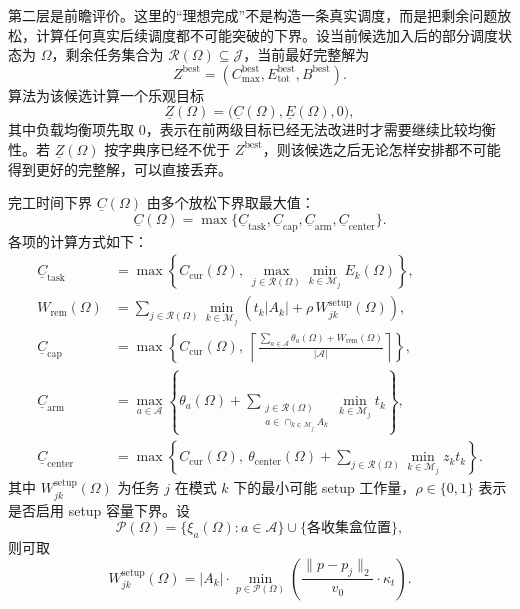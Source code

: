 第二层是前瞻评价。这里的“理想完成”不是构造一条真实调度，而是把剩余问题放松，计算任何真实后续调度都不可能突破的下界。设当前候选加入后的部分调度状态为 $\Omega$，剩余任务集合为 $\mathcal{R}(\Omega)\subseteq\mathcal{J}$，当前最好完整解为
\[
    Z^{\mathrm{best}}=(C_{\max}^{\mathrm{best}},E_{\mathrm{tot}}^{\mathrm{best}},B^{\mathrm{best}}).
\]
算法为该候选计算一个乐观目标
\[
    \underline{Z}(\Omega)=\bigl(\underline C(\Omega),\underline E(\Omega),0\bigr),
\]
其中负载均衡项先取 $0$，表示在前两级目标已经无法改进时才需要继续比较均衡性。若 $\underline{Z}(\Omega)$ 按字典序已经不优于 $Z^{\mathrm{best}}$，则该候选之后无论怎样安排都不可能得到更好的完整解，可以直接丢弃。

完工时间下界 $\underline C(\Omega)$ 由多个放松下界取最大值：
\[
    \underline C(\Omega)
    = \max\{\underline C_{\mathrm{task}},
             \underline C_{\mathrm{cap}},
             \underline C_{\mathrm{arm}},
             \underline C_{\mathrm{center}}\}.
\]
各项的计算方式如下：
\[
\begin{aligned}
    \underline C_{\mathrm{task}}
    &= \max\left\{C_{\mathrm{cur}}(\Omega),\ 
       \max_{j\in\mathcal{R}(\Omega)}\min_{k\in\mathcal{M}_j} E_k(\Omega)\right\},\\
    W_{\mathrm{rem}}(\Omega)
    &= \sum_{j\in\mathcal{R}(\Omega)}
       \min_{k\in\mathcal{M}_j}\left(t_k|A_k|+\rho\, W_{jk}^{\mathrm{setup}}(\Omega)\right),\\
    \underline C_{\mathrm{cap}}
    &= \max\left\{C_{\mathrm{cur}}(\Omega),\
       \left\lceil \frac{\sum_{a\in \mathcal{A}} \theta_a(\Omega)+W_{\mathrm{rem}}(\Omega)}{|\mathcal{A}|}\right\rceil
       \right\},\\
    \underline C_{\mathrm{arm}}
    &= \max_{a\in \mathcal{A}}\left\{\theta_a(\Omega)+
       \sum_{\substack{j\in\mathcal{R}(\Omega)\\ a\in \cap_{k\in\mathcal{M}_j} A_k}}
       \min_{k\in\mathcal{M}_j} t_k\right\},\\
    \underline C_{\mathrm{center}}
    &= \max\left\{C_{\mathrm{cur}}(\Omega),\
       \theta_{\mathrm{center}}(\Omega)+
       \sum_{j\in\mathcal{R}(\Omega)} \min_{k\in\mathcal{M}_j} z_k t_k\right\}.
\end{aligned}
\]
其中 $W_{jk}^{\mathrm{setup}}(\Omega)$ 为任务 $j$ 在模式 $k$ 下的最小可能 setup 工作量，$\rho\in\{0,1\}$ 表示是否启用 setup 容量下界。设
\[
    \mathcal{P}(\Omega)=
    \{\xi_a(\Omega):a\in\mathcal{A}\}\cup\{\text{各收集盒位置}\},
\]
则可取
\[
    W_{jk}^{\mathrm{setup}}(\Omega)
    =
    |A_k|\cdot
    \min_{p\in\mathcal{P}(\Omega)}
    \left(\frac{\|p-p_j\|_2}{v_0}\cdot\kappa_t\right).
\]
